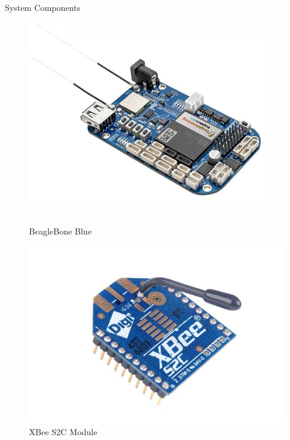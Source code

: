 \documentclass{beamer}
\begin{document}
\begin{frame}{System Components}
\begin{figure}
\begin{minipage}[t]{0.32\textwidth}
      \includegraphics[width=1\textwidth]{figs/img/beaglebone_blue}
      \caption{BeagleBone Blue}
      \label{fig:beagleboneBlue}
    \end{minipage}
    \begin{minipage}[t]{0.32\textwidth}
      \includegraphics[width=1\textwidth]{figs/img/Xbee-S2C-Module}
      \caption{XBee S2C Module}
      \label{fig:XBeeModule}
    \end{minipage}
  \end{figure}
\end{frame} 

\end{document}
